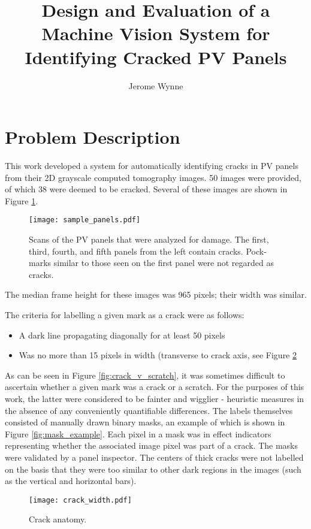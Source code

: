 \documentclass[11pt]{article} %
\title{Design and Evaluation of a Machine Vision System for Identifying Cracked PV Panels}
\author{Jerome Wynne}
\begin{document}
\maketitle

\section{Problem Description}

This work developed a system for automatically identifying cracks in PV panels from their 2D grayscale computed tomography images. 50 images were provided, of which 38 were deemed to be cracked. Several of these images are shown in Figure \ref{fig:sample_panels}.
\begin{figure}[h!]
\texttt{[image: sample\_panels.pdf]}
\caption{Scans of the PV panels that were analyzed for damage. The first, third, fourth, and fifth panels from the left contain cracks. Pock-marks similar to those seen on the first panel were not regarded as cracks.}
\label{fig:sample_panels}
\end{figure}
 The median frame height for these images was 965 pixels; their width was similar.

 The criteria for labelling a given mark as a crack were as follows:
\begin{itemize}
	\item A dark line propagating diagonally for at least 50 pixels
	\item Was no more than 15 pixels in width (transverse to crack axis, see Figure \ref{fig:crack_width}
\end{itemize}
As can be seen in Figure \ref{fig:crack_v_scratch}, it was sometimes difficult to ascertain whether a given mark was a crack or a scratch. For the purposes of this work, the latter were considered to be fainter and wigglier - heuristic measures in the absence of any conveniently quantifiable differences. The labels themselves consisted of manually drawn binary masks, an example of which is shown in Figure \ref{fig:mask_example}. Each pixel in a mask was in effect indicators representing whether the associated image pixel was part of a crack. The masks were validated by a panel inspector. The centers of thick cracks were not labelled on the basis that they were too similar to other dark regions in the images (such as the vertical and horizontal bars).

\begin{figure}[h!]
\texttt{[image: crack\_width.pdf]}
\caption{Crack anatomy.}
\label{fig:crack_width}
\end{figure}
\end{document}
